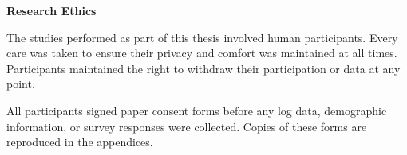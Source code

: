 \begin{center}
	{\huge\textbf{Research Ethics}}
	
	\vspace{1cm}
\end{center}
The studies performed as part of this thesis involved human participants.
Every care was taken to ensure their privacy and comfort was maintained at
all times. Participants maintained the right to withdraw their participation
or data at any point.


All participants signed paper consent forms before any log data, demographic information, or survey responses were collected. Copies of these forms are reproduced in the appendices.
